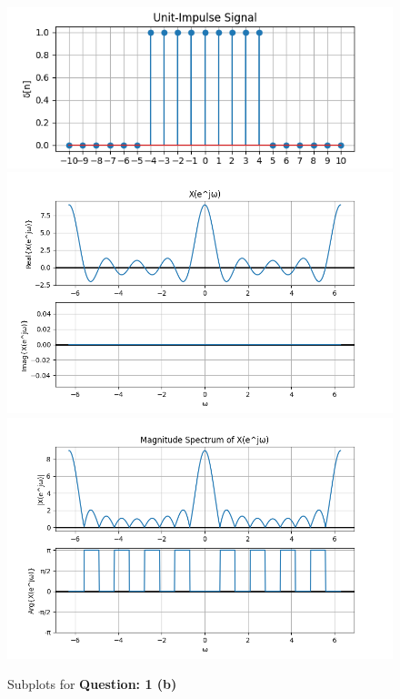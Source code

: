 \documentclass{article}
\begin{document}
\begin{enumerate}[label=(\alph*)]
        \pagebreak

        \begin{figure}[ht]
            \centering
            \includegraphics[scale=0.925]{./Assets/solution-1b-1.png}
            \includegraphics[scale=0.7]{./Assets/solution-1b-2.png}
            \includegraphics[scale=0.7]{./Assets/solution-1b-3.png}
            \caption*{Subplots for \textbf{Question: 1 (b)}}
        \end{figure}

    \end{enumerate}
\end{document}
